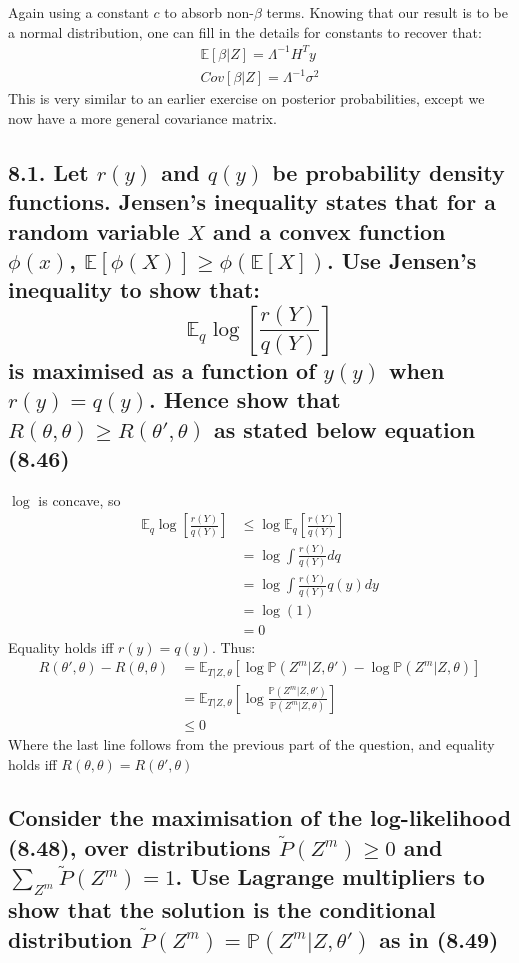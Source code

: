 Again using a constant $c$ to absorb non-$\beta$ terms.
Knowing that our result is to be a normal distribution, one can fill in the details for constants to recover that:
\begin{align*}
    \mathbb{E}\left[\beta\vert Z\right] = \Lambda^{-1}  H^T y\\
    Cov\left[\beta\vert Z\right] = \Lambda^{-1} \sigma^2
\end{align*}
This is very similar to an earlier exercise on posterior probabilities, except we now have a more general covariance matrix. 

\subsection*{8.1. Let $r(y)$ and $q(y)$ be probability density functions. Jensen's inequality states that for a random variable $X$ and a convex function $\phi(x)$, $\mathbb{E}\left[\phi(X)\right] \geq \phi\left(\mathbb{E}\left[ X \right] \right)$.
Use Jensen's inequality to show that:
$$\mathbb{E}_q \log \left[ \frac{r(Y)}{q(Y)}\right] $$ 
is maximised as a function of $y(y)$ when $r(y) = q(y)$. Hence show that $R(\theta, \theta) \geq R(\theta', \theta)$ as stated below equation (8.46)
}

$\log$ is concave, so
\begin{align*}
    \mathbb{E}_q \log \left[ \frac{r(Y)}{q(Y)}\right] &\leq \log \mathbb{E}_q \left[\frac{r(Y)}{q(Y)}\right] \\ 
    &= \log \int \frac{r(Y)}{q(Y)} dq \\ 
    &= \log \int \frac{r(Y) }{q(Y)} q(y) dy \\
    &= \log(1) \\
    &= 0
\end{align*}
Equality holds iff $r(y) = q(y)$. Thus:
\begin{align*}
    R(\theta', \theta) - R(\theta, \theta) &= \mathbb{E}_{T|Z, \theta}\left[\log \mathbb{P}\left(Z^m|Z, \theta'\right) - \log \mathbb{P}\left(Z^m|Z, \theta\right)\right] \\
    &= \mathbb{E}_{T|Z, \theta}\left[\log \frac{\mathbb{P}\left(Z^m|Z, \theta'\right)}{ \mathbb{P}\left(Z^m|Z, \theta \right)}\right] \\
    &\leq 0
\end{align*}
Where the last line follows from the previous part of the question, and equality holds iff $R(\theta, \theta) = R(\theta', \theta)$

\subsection*{Consider the maximisation of the log-likelihood (8.48), over distributions $\tilde{P}(Z^m) \geq 0$ and $\sum_{Z^m} \tilde{P}(Z^m) = 1$. Use Lagrange multipliers to show that the solution is the conditional distribution $\tilde{P}(Z^m) =\mathbb{P}(Z^m \vert Z, \theta')$ as in (8.49)}

